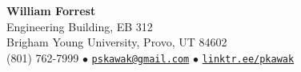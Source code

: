 \documentclass[letterpaper,11pt]{article}
\def\name{Pierre Kawak}
\begin{document}


\begin{center}
  {\LARGE \textbf{William Forrest} }\\[1ex]
  Engineering Building, EB 312 \\
  Brigham Young University, Provo, UT 84602 \\  
  (801) 762-7999 $\bullet$ \href{mailto:pskawak@gmail.com}{\tt pskawak@gmail.com} $\bullet$ \href{https://linktr.ee/pkawak}{\tt linktr.ee/pkawak} \\
\end{center}


\vspace{-0.8cm}
\end{document}
